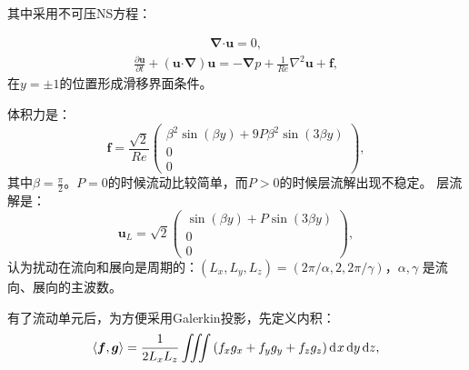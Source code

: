 \documentclass[UTF8,zihao=5]{ctexart} %
\begin{document}
其中采用不可压NS方程：


\begin{gather} \boldsymbol{\nabla} \boldsymbol{\cdot} \boldsymbol{u}=0, \end{gather}
\begin{gather}\frac{\partial \boldsymbol{u}}{\partial t} + (\boldsymbol{u} \boldsymbol{\cdot} \boldsymbol{\nabla}) \boldsymbol{u} ={-} \boldsymbol{\nabla} p + \frac{1}{{Re}}\nabla^2 \boldsymbol{u} + \boldsymbol{f}, \end{gather}
在$y=\pm 1$的位置形成滑移界面条件。

体积力是：
\begin{equation} \boldsymbol{f} = \frac{\sqrt{2}}{Re} \left(\begin{array}{c} \beta^2 \sin(\beta y)+9 P \beta^2 \sin(3 \beta y)\\ 0\\ 0 \end{array}\right), \end{equation}
其中$\beta=\frac{\pi}{2}$。$P=0$的时候流动比较简单，而$P>0$的时候层流解出现不稳定。
层流解是：
\begin{equation} \boldsymbol{u}_L = \sqrt{2}\left(\begin{array}{c} \sin(\beta y)+P\sin(3\beta y)\\ 0\\ 0 \end{array}\right), \end{equation}
认为扰动在流向和展向是周期的：$(L_x,L_y,L_z)=(2{ \pi} /\alpha, 2, 2{ \pi} / \gamma )$，$\alpha,\gamma$
是流向、展向的主波数。

有了流动单元后，为方便采用Galerkin投影，先定义内积：
\begin{equation} \langle \boldsymbol{f}, \boldsymbol{g} \rangle = \frac{1}{2L_x L_z} \iiint{(f_x g_x + f_yg_y + f_zg_z)\, \mathrm{d}\kern0.7pt x\,\mathrm{d} y\,\mathrm{d}z}, \end{equation}
\end{document}
